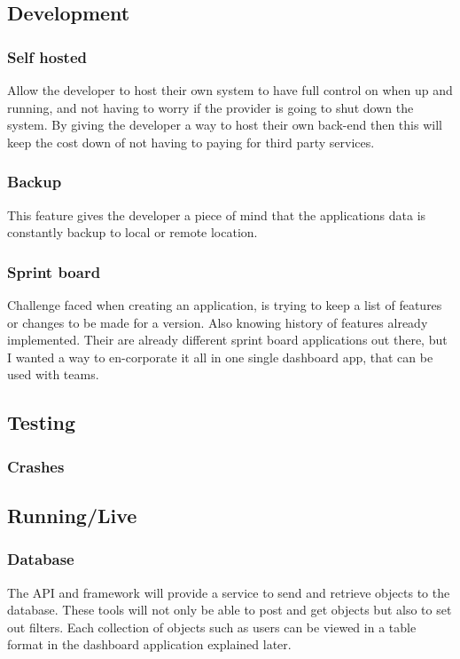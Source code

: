 \subsection{Development}

\subsubsection{Self hosted}
Allow the developer to host their own system to have full control on when up and running, and not having to worry if the provider is going to shut down the system. By giving the developer a way to host their own back-end then this will keep the cost down of not having to paying for third party services.

\subsubsection{Backup}
This feature gives the developer a piece of mind that the applications data is constantly backup to local or remote location.

\subsubsection{Sprint board}
Challenge faced when creating an application, is trying to keep a list of features or changes to be made for a version. Also knowing history of features already implemented. Their are already different sprint board applications out there, but I wanted a way to en-corporate it all in one single dashboard app, that can be used with teams.


\subsection{Testing}

\subsubsection{Crashes}

\subsection{Running/Live}

\subsubsection{Database}
The API and framework will provide a service to send and retrieve objects to the  database. These tools will not only be able to post and get objects but also to set out filters. Each collection of objects such as users can be viewed in a table format in the dashboard application explained later.

